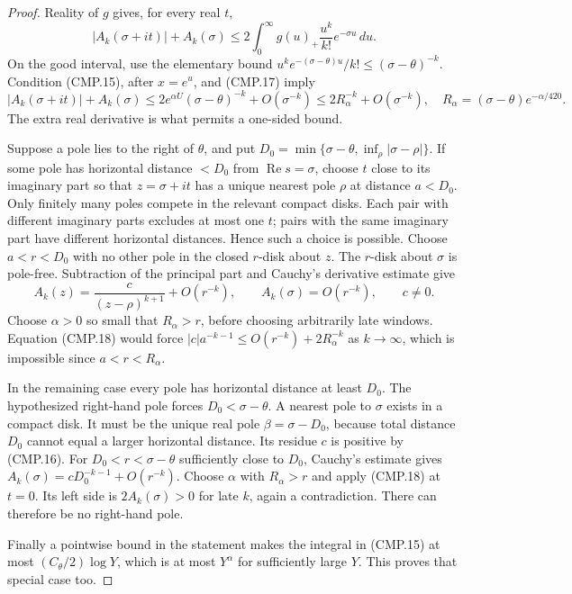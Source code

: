 \begin{proof}
Reality of $g$ gives, for every real $t$,
\[
 |A_k(\sigma+it)|+A_k(\sigma)
       \le2\int_0^\infty g(u)_+\frac{u^k}{k!}e^{-\sigma u}\,du.
\]
On the good interval, use the elementary bound
$u^ke^{-(\sigma-\theta)u}/k!\le(\sigma-\theta)^{-k}$.
Condition (CMP.15), after $x=e^u$, and (CMP.17) imply
\[
 |A_k(\sigma+it)|+A_k(\sigma)
       \le2e^{\alpha U}(\sigma-\theta)^{-k}+O(\sigma^{-k})
       \le2R_\alpha^{-k}+O(\sigma^{-k}),
 \quad R_\alpha=(\sigma-\theta)e^{-\alpha/420}.
                                                               \tag{CMP.18}
\]
The extra real derivative is what permits a one-sided bound.

Suppose a pole lies to the right of $\theta$, and put
$D_0=\min\{\sigma-\theta,\inf_\rho|\sigma-\rho|\}$.
If some pole has horizontal distance $<D_0$ from
$\operatorname{Re}s=\sigma$, choose $t$ close to its imaginary
part so that $z=\sigma+it$ has a unique nearest pole $\rho$
at distance $a<D_0$.  Only finitely many poles compete in the
relevant compact disks.  Each pair with different imaginary parts
excludes at most one $t$; pairs with the same imaginary part have
different horizontal distances.  Hence such a choice is possible.
Choose $a<r<D_0$ with no other pole in the closed $r$-disk about
$z$.  The $r$-disk about $\sigma$ is pole-free.  Subtraction of
the principal part and Cauchy's derivative estimate give
\[
 A_k(z)=\frac{c}{(z-\rho)^{k+1}}+O(r^{-k}),\qquad
 A_k(\sigma)=O(r^{-k}),\qquad c\ne0.
\]
Choose $\alpha>0$ so small that $R_\alpha>r$, before choosing
arbitrarily late windows.  Equation (CMP.18) would force
$|c|a^{-k-1}\le O(r^{-k})+2R_\alpha^{-k}$ as $k\to\infty$,
which is impossible since $a<r<R_\alpha$.

In the remaining case every pole has horizontal distance at least
$D_0$.  The hypothesized right-hand pole forces
$D_0<\sigma-\theta$.  A nearest pole to $\sigma$ exists in a
compact disk.  It must be the unique real pole
$\beta=\sigma-D_0$, because total distance $D_0$ cannot equal a
larger horizontal distance.  Its residue $c$ is positive by
(CMP.16).  For $D_0<r<\sigma-\theta$ sufficiently close to
$D_0$, Cauchy's estimate gives
$A_k(\sigma)=cD_0^{-k-1}+O(r^{-k})$.
Choose $\alpha$ with $R_\alpha>r$ and apply (CMP.18) at $t=0$.
Its left side is $2A_k(\sigma)>0$ for late $k$, again a
contradiction.  There can therefore be no right-hand pole.

Finally a pointwise bound in the statement makes the integral in
(CMP.15) at most $(C_\theta/2)\log Y$, which is at most
$Y^\alpha$ for sufficiently large $Y$.  This proves that
special case too.
\end{proof}

